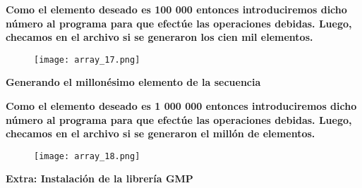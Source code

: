 \documentclass[letterpaper]{article}
\begin{document}
\begin{flushleft}
\textbf{\Large Como el elemento deseado es 100 000 entonces introduciremos dicho n\'umero al programa para que efect\'ue las operaciones debidas. Luego, checamos en el archivo si se generaron los cien mil elementos.\\}

\end{flushleft}
\begin{center}
\begin{figure}[H] %
\texttt{[image: array\_17.png]}
\end{figure}
\end{center}

\vspace{-1.0cm}

\begin{center}
\textbf{\LARGE Generando el millon\'esimo elemento de la secuencia\\}
\vspace{0.5cm}
\end{center}

\begin{flushleft}
\textbf{\Large Como el elemento deseado es 1 000 000 entonces introduciremos dicho n\'umero al programa para que efect\'ue las operaciones debidas. Luego, checamos en el archivo si se generaron el mill\'on de elementos.\\}
\end{flushleft}
\begin{center}
\begin{figure}[H] %
\texttt{[image: array\_18.png]}
\end{figure}
\end{center}

\vspace{-1.0cm}

\begin{center}
\textbf{\LARGE Extra: Instalaci\'on de la librer\'ia GMP\\}
\vspace{0.5cm}
\end{center}
\end{document}
